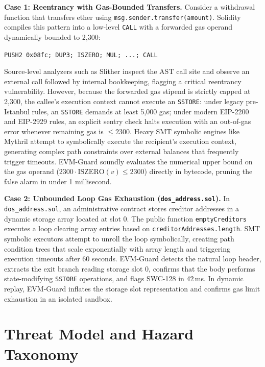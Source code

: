 \documentclass[conference]{IEEEtran}
\begin{document}
\smallskip
\noindent\textbf{Case 1: Reentrancy with Gas-Bounded Transfers.}
Consider a withdrawal function that transfers ether using \texttt{msg.sender.transfer(amount)}. Solidity compiles this pattern into a low-level \texttt{CALL} with a forwarded gas operand dynamically bounded to 2,300:
\begin{center}
\small
\texttt{PUSH2 0x08fc; DUP3; ISZERO; MUL; ...; CALL}
\end{center}
Source-level analyzers such as Slither inspect the AST call site and observe an external call followed by internal bookkeeping, flagging a critical reentrancy vulnerability. However, because the forwarded gas stipend is strictly capped at 2,300, the callee's execution context cannot execute an \texttt{SSTORE}: under legacy pre-Istanbul rules, an \texttt{SSTORE} demands at least 5,000 gas; under modern EIP-2200 and EIP-2929 rules, an explicit sentry check halts execution with an out-of-gas error whenever remaining gas is $\le 2300$. Heavy SMT symbolic engines like Mythril attempt to symbolically execute the recipient's execution context, generating complex path constraints over external balances that frequently trigger timeouts. EVM-Guard soundly evaluates the numerical upper bound on the gas operand ($2300 \cdot \mathrm{ISZERO}(v) \le 2300$) directly in bytecode, pruning the false alarm in under 1 millisecond.

\smallskip
\noindent\textbf{Case 2: Unbounded Loop Gas Exhaustion (\texttt{dos\_address.sol}).}
In \texttt{dos\_address.sol}, an administrative contract stores creditor addresses in a dynamic storage array located at slot 0. The public function \texttt{emptyCreditors} executes a loop clearing array entries based on \texttt{creditorAddresses.length}. SMT symbolic executors attempt to unroll the loop symbolically, creating path condition trees that scale exponentially with array length and triggering execution timeouts after 60 seconds. EVM-Guard detects the natural loop header, extracts the exit branch reading storage slot 0, confirms that the body performs state-modifying \texttt{SSTORE} operations, and flags SWC-128 in 42\,ms. In dynamic replay, EVM-Guard inflates the storage slot representation and confirms gas limit exhaustion in an isolated sandbox.

\section{Threat Model and Hazard Taxonomy}\label{sec:taxonomy}
\end{document}
